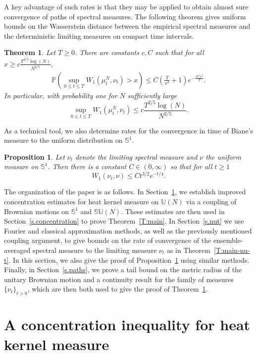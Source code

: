 \documentclass[11pt]{article}
\newtheorem{thm}[theo]{Theorem}
\newtheorem{prop}[theo]{Proposition}
\theoremstyle{definition}
\numberwithin{equation}{section}
\numberwithin{figure}{section}
\numberwithin{table}{section}
\newcommand{\Prob}{\mathbb{P}}
\begin{document}
A key advantage of such rates is that they may be applied to obtain almost sure convergence of paths of spectral measures. The following theorem gives uniform bounds on the Wasserstein distance between the empirical spectral measures and the deterministic limiting measures on compact time intervals.


\begin{thm}\label{T:close-paths}
Let $T\ge 0$. There are constants $c,C$ such that for all $x\ge c\frac{T^{2/5}\log(N)}{N^{2/5}},$
\begin{align*}
\Prob\left(\sup_{0\le t\le
T}W_1(\mu^N_t,\nu_t)>x\right)\le C\left(\frac{T}{x^2}+1\right)e^{-\frac{N^2x^2}{T}}.
\end{align*}
In particular, with probability one for $N$ sufficiently large
\[
\sup_{0\le t\le T}W_1(\mu^N_t,\nu_t)\le c\frac{T^{2/5}\log(N)}{N^{2/5}}.
\]
\end{thm}


As a technical tool, we also determine rates for the convergence in time of Biane's measure to the uniform distribution on $\mathbb{S}^1$.

\begin{prop}\label{T:biane-to-uniform}
Let $\nu_t$ denote the limiting spectral measure and $\nu$ the uniform measure on $\mathbb{S}^1$. Then there is a constant $C\in(0,\infty)$ so that for all $t\ge1$
\[
W_1(\nu_t,\nu)\le Ct^{3/2}e^{-t/4}.
\]
\end{prop}

The organization of the paper is as follows. In Section~\ref{s.lsi}, we establish improved concentration estimates for heat kernel measure on $\mathbb{U}(N)$ via a coupling of Brownian motions on $\mathbb{S}^1$ and $\mathbb{SU}(N)$. These estimates are then used in Section~\ref{s.concentration} to prove Theorem~\ref{T:main}. In Section~\ref{s.nut} we use Fourier and classical approximation methods, as well as the previously mentioned coupling argument, to give bounds on the rate of convergence of the ensemble-averaged spectral measure to the limiting measure $\nu_t$ as in Theorem~\ref{T:main-nu-t}. In this section, we also give the proof of Proposition~\ref{T:biane-to-uniform} using similar methods. Finally, in Section~\ref{s.paths}, we prove a tail bound on the metric radius of the unitary Brownian motion and a continuity result for the family of measures $\{\nu_t\}_{t>0}$, which are then both used to give the proof of Theorem~\ref{T:close-paths}.


\section{A concentration inequality for heat kernel measure}\label{s.lsi}
\end{document}
